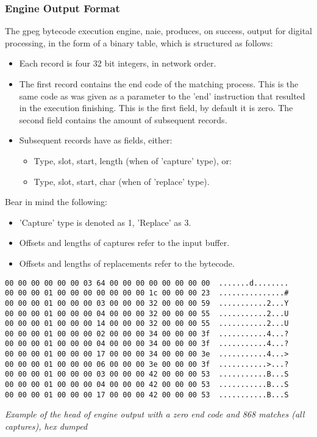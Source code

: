 \subsubsection{Engine Output Format}

The gpeg bytecode execution engine, naie, produces, on success, output for
digital processing, in the form of a binary table, which is structured
as follows:

\begin{itemize}

\item Each record is four 32 bit integers, in network order.

\item The first record contains the end code of the matching process.
This is the same code as was given as a parameter to the 'end'
instruction that resulted in the execution finishing. This is the
first field, by default it is zero.
The second field contains the amount of subsequent records.

\item Subsequent records have as fields, either:

\begin{itemize}
\item Type, slot, start, length (when of 'capture' type), or:
\item Type, slot, start, char (when of 'replace' type).
\end{itemize}

\end{itemize}

Bear in mind the following:

\begin{itemize}
\item 'Capture' type is denoted as 1, 'Replace' as 3.
\item Offsets and lengths of captures refer to the input buffer.
\item Offsets and lengths of replacements refer to the bytecode.
\end{itemize}

\begin{myquote}
\begin{verbatim}
00 00 00 00 00 00 03 64 00 00 00 00 00 00 00 00  .......d........
00 00 00 01 00 00 00 00 00 00 00 1c 00 00 00 23  ...............#
00 00 00 01 00 00 00 03 00 00 00 32 00 00 00 59  ...........2...Y
00 00 00 01 00 00 00 04 00 00 00 32 00 00 00 55  ...........2...U
00 00 00 01 00 00 00 14 00 00 00 32 00 00 00 55  ...........2...U
00 00 00 01 00 00 00 02 00 00 00 34 00 00 00 3f  ...........4...?
00 00 00 01 00 00 00 04 00 00 00 34 00 00 00 3f  ...........4...?
00 00 00 01 00 00 00 17 00 00 00 34 00 00 00 3e  ...........4...>
00 00 00 01 00 00 00 06 00 00 00 3e 00 00 00 3f  ...........>...?
00 00 00 01 00 00 00 03 00 00 00 42 00 00 00 53  ...........B...S
00 00 00 01 00 00 00 04 00 00 00 42 00 00 00 53  ...........B...S
00 00 00 01 00 00 00 17 00 00 00 42 00 00 00 53  ...........B...S
\end{verbatim}
\end{myquote}
\textit{Example of the head of engine output with a zero end code
and 868 matches (all captures), hex dumped}
